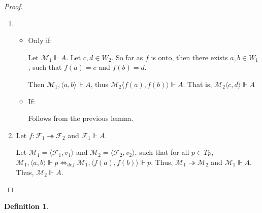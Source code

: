\documentclass[a4paper]{article}
\theoremstyle{defin}
\newtheorem{defin}{Definition}
\theoremstyle{theorem}
\theoremstyle{prop}
\theoremstyle{lemma}
\theoremstyle{ex}
\theoremstyle{col}
\begin{document}
\begin{proof}
$ $

\begin{enumerate}
  \item
  \begin{itemize}
    \item Only if:

    Let $\mathcal{M}_1 \Vdash A$. Let $c, d \in W_2$. So far as $f$ is onto,
    then there exists $a, b \in W_1$, such that $f(a) = c$ and $f(b) = d$.

    Then $\mathcal{M}_1, \langle a, b \rangle \Vdash A$, thus $\mathcal{M}_2 \langle f(a), f(b) \rangle \Vdash A$.
    That is, $\mathcal{M}_2 \langle c, d \rangle \Vdash A$

    \item If:

    Follows from the previous lemma.
  \end{itemize}
  \item Let $f : \mathcal{F}_1 \twoheadrightarrow \mathcal{F}_2$ and $\mathcal{F}_1 \Vdash A$.

  Let $\mathcal{M}_1 = \langle \mathcal{F}_1, v_1 \rangle$ and $\mathcal{M}_2 = \langle \mathcal{F}_2, v_2 \rangle$, such that
  for all $p \in Tp$,
  $\mathcal{M}_1, \langle a, b \rangle \Vdash p \Leftrightarrow_{def} \mathcal{M}_1, \langle f(a), f(b) \rangle \Vdash p$.
  Thus, $\mathcal{M}_1 \twoheadrightarrow \mathcal{M}_2$ and $\mathcal{M}_1 \Vdash A$. Thus, $\mathcal{M}_2 \Vdash A$.
\end{enumerate}
\end{proof}

\begin{defin}
\end{defin}
\end{document}
